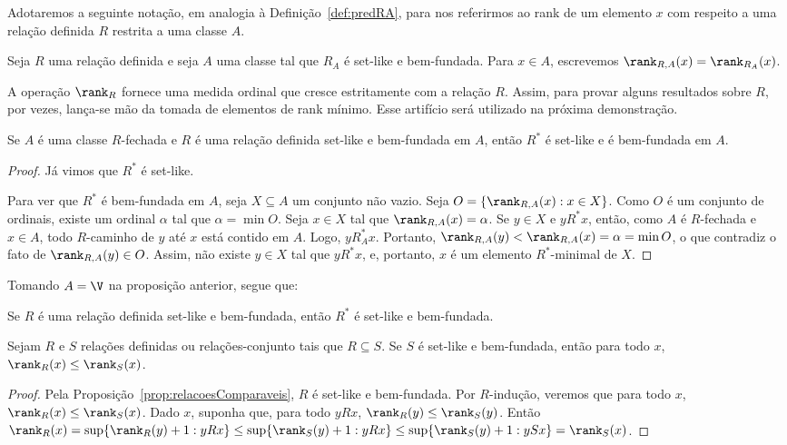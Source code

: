 Adotaremos a seguinte notação, em analogia à Definição~\ref{def:predRA}, para nos referirmos ao rank de um elemento $x$ com respeito a uma relação definida $R$ restrita a uma classe $A$.

\begin{definition}[$\ZFmP$]
    Seja $R$ uma relação definida e seja $A$ uma classe tal que $R_A$ é set-like e bem-fundada.
    Para $x\in A$, escrevemos $\rank_{R,A}(x)=\rank_{R_A}(x)$.
\end{definition}

A operação $\rank_R$ fornece uma medida ordinal que cresce estritamente com a relação $R$.
Assim, para provar alguns resultados sobre $R$, por vezes, lança-se mão da tomada de elementos de rank mínimo.
Esse artifício será utilizado na próxima demonstração.

\begin{proposition}[$\ZFmP$]\label{prop:fechoTransitivoBemFundadoEmA}
    Se $A$ é uma classe $R$-fechada e $R$ é uma relação definida set-like e bem-fundada em $A$, então $R^*$ é set-like e é bem-fundada em $A$.
\end{proposition}
\begin{proof}
    Já vimos que $R^*$ é set-like.

    Para ver que $R^*$ é bem-fundada em $A$, seja $X\subseteq A$ um conjunto não vazio.
    Seja $O=\{\rank_{R, A}(x): x\in X\}$.
    Como $O$ é um conjunto de ordinais, existe um ordinal $\alpha$ tal que $\alpha=\min O$.
    Seja $x\in X$ tal que $\rank_{R, A}(x)=\alpha$.
    Se $y\in X$ e $y R^* x$, então, como $A$ é $R$-fechada e $x\in A$, todo $R$-caminho de $y$ até $x$ está contido em $A$.
    Logo, $y R_A^* x$.
    Portanto, $\rank_{R, A}(y)<\rank_{R, A}(x)=\alpha=\min O$, o que contradiz o fato de $\rank_{R,A}(y)\in O$.
    Assim, não existe $y\in X$ tal que $y R^* x$, e, portanto, $x$ é um elemento $R^*$-minimal de $X$.
\end{proof}

Tomando $A=\V$ na proposição anterior, segue que:

\begin{corollary}[$\ZFmP$]
    Se $R$ é uma relação definida set-like e bem-fundada, então $R^*$ é set-like e bem-fundada.
\end{corollary}



\begin{proposition}[$\ZFmP$]\label{prop:relacoesComparaveis2}
    Sejam $R$ e $S$ relações definidas ou relações-conjunto tais que $R\subseteq S$.
    Se $S$ é set-like e bem-fundada, então para todo $x$, $\rank_R(x)\leq \rank_S(x)$.
\end{proposition}
\begin{proof}
    Pela Proposição~\ref{prop:relacoesComparaveis}, $R$ é set-like e bem-fundada.
    Por $R$-indução, veremos que para todo $x$, $\rank_R(x)\leq \rank_S(x)$.
    Dado $x$, suponha que, para todo $y R x$, $\rank_R(y)\leq \rank_S(y)$.
    Então $\rank_R(x)=\sup\{\rank_R(y)+1: y R x\}\leq \sup\{\rank_S(y)+1: y R x\}\leq \sup\{\rank_S(y)+1: y S x\}=\rank_S(x)$.
\end{proof}

